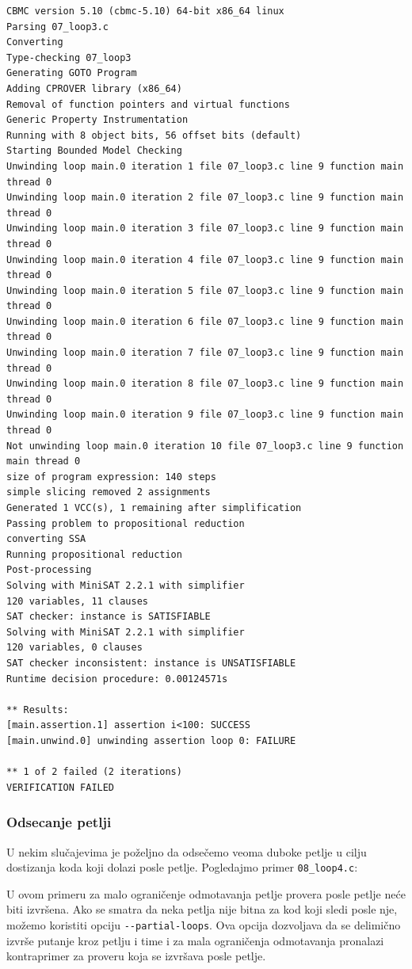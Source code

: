 \begin{verbatim}
CBMC version 5.10 (cbmc-5.10) 64-bit x86_64 linux
Parsing 07_loop3.c
Converting
Type-checking 07_loop3
Generating GOTO Program
Adding CPROVER library (x86_64)
Removal of function pointers and virtual functions
Generic Property Instrumentation
Running with 8 object bits, 56 offset bits (default)
Starting Bounded Model Checking
Unwinding loop main.0 iteration 1 file 07_loop3.c line 9 function main thread 0
Unwinding loop main.0 iteration 2 file 07_loop3.c line 9 function main thread 0
Unwinding loop main.0 iteration 3 file 07_loop3.c line 9 function main thread 0
Unwinding loop main.0 iteration 4 file 07_loop3.c line 9 function main thread 0
Unwinding loop main.0 iteration 5 file 07_loop3.c line 9 function main thread 0
Unwinding loop main.0 iteration 6 file 07_loop3.c line 9 function main thread 0
Unwinding loop main.0 iteration 7 file 07_loop3.c line 9 function main thread 0
Unwinding loop main.0 iteration 8 file 07_loop3.c line 9 function main thread 0
Unwinding loop main.0 iteration 9 file 07_loop3.c line 9 function main thread 0
Not unwinding loop main.0 iteration 10 file 07_loop3.c line 9 function main thread 0
size of program expression: 140 steps
simple slicing removed 2 assignments
Generated 1 VCC(s), 1 remaining after simplification
Passing problem to propositional reduction
converting SSA
Running propositional reduction
Post-processing
Solving with MiniSAT 2.2.1 with simplifier
120 variables, 11 clauses
SAT checker: instance is SATISFIABLE
Solving with MiniSAT 2.2.1 with simplifier
120 variables, 0 clauses
SAT checker inconsistent: instance is UNSATISFIABLE
Runtime decision procedure: 0.00124571s

** Results:
[main.assertion.1] assertion i<100: SUCCESS
[main.unwind.0] unwinding assertion loop 0: FAILURE

** 1 of 2 failed (2 iterations)
VERIFICATION FAILED
\end{verbatim}

\subsubsection{Odsecanje petlji}\label{odsecanje-petlji}

U nekim slučajevima je poželjno da odsečemo veoma duboke petlje u cilju dostizanja koda koji dolazi posle petlje. Pogledajmo primer \texttt{08\_loop4.c}:


U ovom primeru za malo ograničenje odmotavanja petlje provera posle petlje neće biti izvršena. Ako se smatra da neka petlja nije bitna za kod koji sledi posle nje, možemo koristiti opciju \texttt{-{}-partial-loops}. Ova opcija dozvoljava da se delimično izvrše putanje kroz petlju i time i za mala ograničenja odmotavanja pronalazi kontraprimer za proveru koja se izvršava posle petlje.

